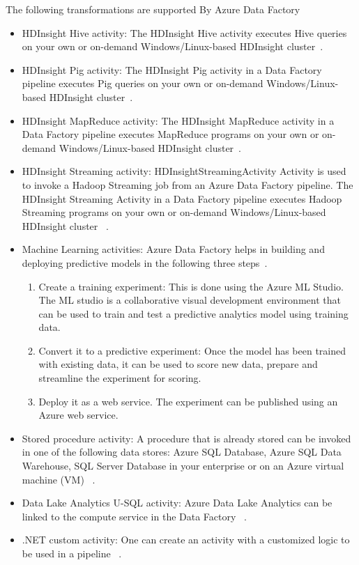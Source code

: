 \documentclass[9pt,twocolumn,twoside]{styles/osajnl}
\begin{document}
The following transformations are supported By Azure Data Factory~\cite{www-microsoft-azure-transform}
\begin{itemize}
    \item HDInsight Hive activity: The HDInsight Hive activity executes Hive queries on your own or on-demand Windows/Linux-based HDInsight cluster~\cite{www-microsoft-azure-hive}.
    \item HDInsight Pig activity: The HDInsight Pig activity in a Data Factory pipeline executes Pig queries on your own or on-demand Windows/Linux-based HDInsight cluster~\cite{www-microsoft-azure-pig}.
    \item HDInsight MapReduce activity: The HDInsight MapReduce activity in a Data Factory pipeline executes MapReduce programs on your own or on-demand Windows/Linux-based HDInsight cluster~\cite{www-microsoft-azure-map}.
    \item HDInsight Streaming activity: HDInsightStreamingActivity Activity is used to invoke a Hadoop Streaming job from an Azure Data Factory pipeline. The HDInsight Streaming Activity in a Data Factory pipeline executes Hadoop Streaming programs on your own or on-demand Windows/Linux-based HDInsight cluster ~\cite{www-microsoft-azure-hsa}.
    \item Machine Learning activities: Azure Data Factory helps in building and deploying predictive models in the following three steps~\cite{www-microsoft-azure-ml}.
    \begin{enumerate}
        \item Create a training experiment: This is done using the Azure ML Studio. The ML studio is a collaborative visual development environment that can be used to train and test a predictive analytics model using training data.
        \item Convert it to a predictive experiment: Once the model has been trained with existing data, it can be used to score new data, prepare and streamline the experiment for scoring.
        \item Deploy it as a web service. The experiment can be published using an Azure web service. 
    \end{enumerate}
    \item Stored procedure activity: A procedure that is already stored can be invoked in one of the following data stores:  Azure SQL Database, Azure SQL Data Warehouse, SQL Server Database in your enterprise or on an Azure virtual machine (VM)~\cite{www-microsoft-azure-stored} .
    \item Data Lake Analytics U-SQL activity: Azure Data Lake Analytics can be linked to the compute service in the Data Factory ~\cite{www-microsoft-azure-datalake}.
    \item .NET custom activity: One can create an activity with a customized logic to be used in a pipeline ~\cite{www-microsoft-azure-dotnet}.
\end{itemize}
\end{document}
